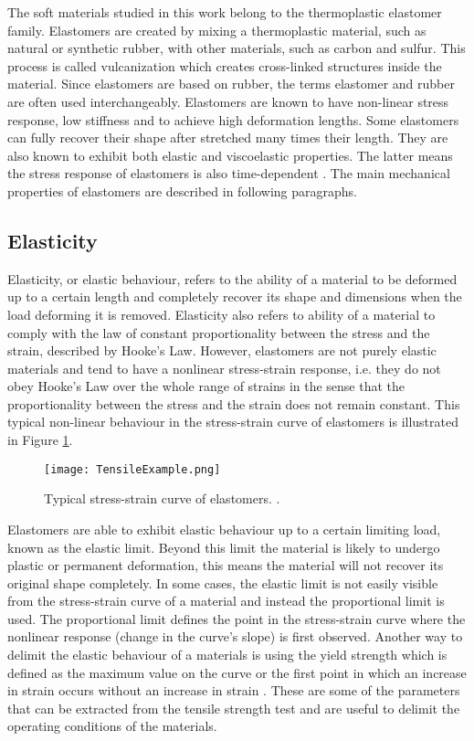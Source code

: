 The soft materials studied in this work belong to the thermoplastic elastomer family. Elastomers are created by mixing a thermoplastic material, such as natural or synthetic rubber, with other materials, such as carbon and sulfur. This process is called vulcanization which creates cross-linked structures inside the material. Since elastomers are based on rubber, the terms elastomer and rubber are often used interchangeably. Elastomers are known to have non-linear stress response, low stiffness and to achieve high deformation lengths. Some elastomers can fully recover their shape after stretched many times their length. They are also known to exhibit both elastic and viscoelastic properties. The latter means the stress response of elastomers is also time-dependent \cite{Bauman2008}. The main mechanical properties of elastomers are described in following paragraphs.
\subsection{Elasticity}
Elasticity, or elastic behaviour, refers to the ability of a material to be deformed up to a certain length and completely recover its shape and dimensions when the load deforming it is removed. Elasticity also refers to ability of a material to comply with the law of constant proportionality between the stress and the strain, described by Hooke's Law. However, elastomers are not purely elastic materials and tend to have a nonlinear stress-strain response, i.e. they do not obey Hooke's Law over the whole range of strains in the sense that the proportionality between the stress and the strain does not remain constant. This typical non-linear behaviour in the stress-strain curve of elastomers is illustrated in Figure \ref{fig:tensile}.

\begin{figure}[hb!]
    \centering
    \texttt{[image: TensileExample.png]}
    \caption{Typical stress-strain curve of elastomers. \cite{Bauman2008}.}
    \label{fig:tensile}
\end{figure}

Elastomers are able to exhibit elastic behaviour up to a certain limiting load, known as the elastic limit. Beyond this limit the material is likely to undergo plastic or permanent deformation, this means the material will not recover its original shape completely. In some cases, the elastic limit is not easily visible from the stress-strain curve of a material and instead the proportional limit is used. The proportional limit defines the point in the stress-strain curve where the nonlinear response (change in the curve's slope) is first observed. Another way to delimit the elastic behaviour of a materials is using the yield strength which is defined as the maximum value on the curve or the first point in which an increase in strain occurs without an increase in strain \cite{ebewele2000}. These are some of the parameters that can be extracted from the tensile strength test and are useful to delimit the operating conditions of the materials.
